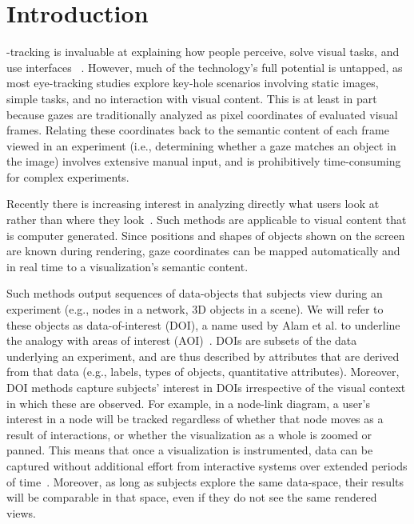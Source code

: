 \section{Introduction}
-tracking is invaluable at explaining how people perceive, solve visual tasks, and use interfaces ~\cite{duchowski2002breadth}. However, much of the technology's full potential is untapped, as most eye-tracking studies explore key-hole scenarios involving static images, simple tasks, and no interaction with visual content. This is at least in part because gazes are traditionally analyzed as pixel coordinates of evaluated visual frames. Relating these coordinates back to the semantic content of each frame viewed in an experiment (i.e., determining whether a gaze matches an object in the image) involves extensive manual input, and is prohibitively time-consuming for complex experiments.
 
Recently there is increasing interest in analyzing directly what users look at rather than where they look~\cite{alam15analyzing, sundstedt2013visual, bernhard2014gaze}. Such methods are applicable to visual content that is computer generated. Since positions and shapes of objects shown on the screen are known during rendering, gaze coordinates can be mapped automatically and in real time to a visualization's semantic content.  

Such methods output sequences of data-objects that subjects view during an experiment (e.g., nodes in a network, 3D objects in a scene). We will refer to these objects as data-of-interest (DOI), a name used by Alam et al. to underline the analogy with areas of interest (AOI)~\cite{alam15analyzing}. DOIs are subsets of the data underlying an experiment, and are thus described by attributes that are derived from that data (e.g., labels, types of objects, quantitative attributes). Moreover, DOI methods capture subjects' interest in DOIs irrespective of the visual context in which these are observed. For example, in a node-link diagram, a user's interest in a node will be tracked regardless of whether that node moves as a result of interactions, or whether the visualization as a whole is zoomed or panned. This means that once a visualization is instrumented, data can be captured without additional effort from interactive systems over extended periods of time~\cite{alam15analyzing}. Moreover, as long as subjects explore the same data-space, their results will be comparable in that space, even if they do not see the same rendered views. 

